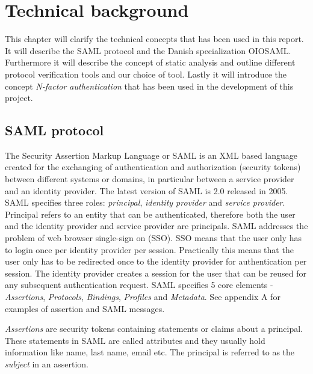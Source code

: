\documentclass[twosided]{report}
\begin{document}
\chapter{Technical background}
\label{chap:techbg}
This chapter will clarify the technical concepts that has been used in this report. It will describe the SAML protocol and the Danish specialization OIOSAML. Furthermore it will describe the concept of static analysis and outline different protocol verification tools and our choice of tool. Lastly it will introduce the concept \emph{N-factor authentication} that has been used in the development of this project.

\section{SAML protocol}
The Security Assertion Markup Language or SAML is an XML based language created for the exchanging of authentication and authorization (security tokens) between different systems or domains, in particular between a service provider and an identity provider. The latest version of SAML is 2.0 released in 2005. SAML specifies three roles: \emph{principal}, \emph{identity provider} and \emph{service provider}. Principal refers to an entity that can be authenticated, therefore both the user and the identity provider and service provider are principals. SAML addresses the problem of web browser single-sign on (SSO). SSO means that the user only has to login once per identity provider per session. Practically this means that the user only has to be redirected once to the identity provider for authentication per session. The identity provider creates a session for the user that can be reused for any subsequent authentication request. SAML specifies 5 core elements - \emph{Assertions}, \emph{Protocols}, \emph{Bindings}, \emph{Profiles} and \emph{Metadata}. See appendix A for examples of assertion and SAML messages.
\par
\emph{Assertions} are security tokens containing statements or claims about a principal. These statements in SAML are called attributes and they usually hold information like name, last name, email etc. The principal is referred to as the \emph{subject} in an assertion.
\end{document}
